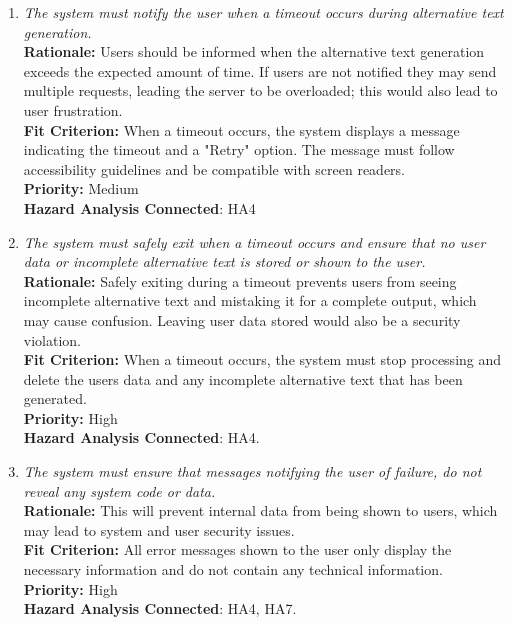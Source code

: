 \documentclass[12pt]{article}
\begin{document}
\begin{enumerate}[label=PR-SR-HA \arabic*., wide=0pt, leftmargin=*]
  \item \emph{The system must notify the user when a timeout occurs during alternative text generation.}\\[2mm]
    {\bf Rationale:} Users should be informed when the alternative text generation exceeds the expected amount of time. If users are not notified they may send multiple requests, leading the server to be overloaded; this would also lead to user frustration.\\
    {\bf Fit Criterion:} When a timeout occurs, the system displays a message indicating the timeout and a "Retry" option. The message must follow accessibility guidelines and be compatible with screen readers.\\
    {\bf Priority:} Medium\\
    {\bf Hazard Analysis Connected}: HA4
  \item \emph{The system must safely exit when a timeout occurs and ensure that no user data or incomplete alternative text is stored or shown to the user.}\\[2mm]
    {\bf Rationale:} Safely exiting during a timeout prevents users from seeing incomplete alternative text and mistaking it for a complete output, which may cause confusion. Leaving user data stored would also be a security violation. \\
    {\bf Fit Criterion:} When a timeout occurs, the system must stop processing and delete the users data and any incomplete alternative text that has been generated.\\
    {\bf Priority:} High\\
    {\bf Hazard Analysis Connected}: HA4.
  \item \emph{The system must ensure that messages notifying the user of failure, do not reveal any system code or data. }\\[2mm]
    {\bf Rationale:} This will prevent internal data from being shown to users, which may lead to system and user security issues. \\
    {\bf Fit Criterion:} All error messages shown to the user only display the necessary information and do not contain any technical information.\\
    {\bf Priority:} High \\
    {\bf Hazard Analysis Connected}: HA4, HA7.
\end{enumerate}
\end{document}
